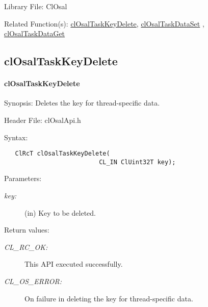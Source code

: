 \begin{Desc}
\item[Library File:]Cl\-Osal\end{Desc}
\begin{Desc}
\item[Related Function(s):]\hyperlink{pageosal124}{cl\-Osal\-Task\-Key\-Delete}, \hyperlink{pageosal125}{cl\-Osal\-Task\-Data\-Set} , 
\hyperlink{pageosal126}{cl\-Osal\-Task\-Data\-Get} \end{Desc}

\newpage
\subsection{clOsalTaskKeyDelete}
\hypertarget{pageosal124}{}\paragraph{cl\-Osal\-Task\-Key\-Delete}\label{pageosal124}
\begin{Desc}
\item[Synopsis:]Deletes the key for thread-specific data.\end{Desc}
\begin{Desc}
\item[Header File:]clOsalApi.h\end{Desc}
\begin{Desc}
\item[Syntax:]

\footnotesize\begin{verbatim}   ClRcT clOsalTaskKeyDelete(
                          CL_IN ClUint32T key);
\end{verbatim}
\normalsize
\end{Desc}
\begin{Desc}
\item[Parameters:]
\begin{description}
\item[{\em key:}](in) Key to be deleted.\end{description}
\end{Desc}
\begin{Desc}
\item[Return values:]
\begin{description}
\item[{\em CL\_\-RC\_\-OK:}]This API executed successfully. \item[{\em CL\_\-OS\_\-ERROR:}]On failure in deleting the key for thread-specific data.\end{description}
\end{Desc}
